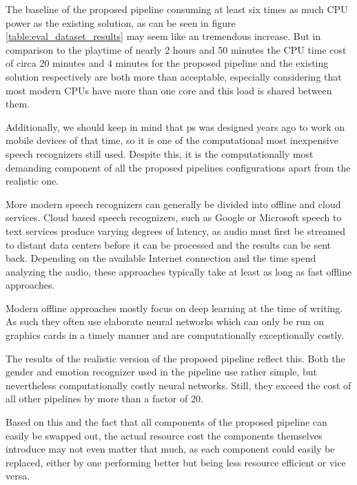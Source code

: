 { %
The baseline of the proposed pipeline consuming at least six times as much CPU power as the existing solution, as can be seen in figure \ref{table:eval_dataset_results} may seem like an tremendous increase.
But in comparison to the playtime of nearly 2 hours and 50 minutes the CPU time cost of circa 20 minutes and 4 minutes for the proposed pipeline and the existing solution respectively are both more than acceptable, especially considering that most modern CPUs have more than one core and this load is shared between them.

Additionally, we should keep in mind that \gls{ps} was designed years ago to work on mobile devices of that time, so it is one of the computational most inexpensive speech recognizers still used. 
Despite this, it is the computationally most demanding component of all the proposed pipelines configurations apart from the realistic one.

More modern speech recognizers can generally be divided into offline and cloud services.
Cloud based speech recognizers, such as Google \cite{GoogleSpeech} or Microsoft \cite{MicrosoftSpeech} speech to text services produce varying degrees of latency, as audio must first be streamed to distant data centers before it can be processed and the results can be sent back.
Depending on the available Internet connection and the time spend analyzing the audio, these approaches typically take at least as long as fast offline approaches.

Modern offline approaches mostly focus on deep learning at the time of writing. %
As such they often use elaborate neural networks which can only be run on graphics cards in a timely manner and are computationally exceptionally costly.

The results of the realistic version of the proposed pipeline reflect this.
Both the gender and emotion recognizer used in the pipeline use rather simple, but nevertheless computationally costly neural networks.
Still, they exceed the cost of all other pipelines by more than a factor of 20.

Based on this and the fact that all components of the proposed pipeline can easily be swapped out, the actual resource cost the components themselves introduce may not even matter that much, as each component could easily be replaced, either by one performing better but being less resource efficient or vice versa.
}


